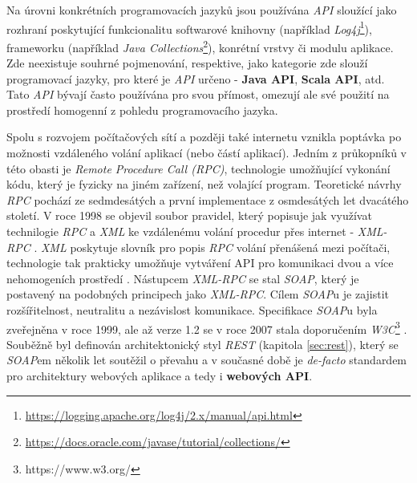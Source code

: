 Na úrovni konkrétních programovacích jazyků jsou používána \textit{API} sloužící jako rozhraní poskytující funkcionalitu softwarové knihovny (například \textit{Log4j}\footnote{\url{https://logging.apache.org/log4j/2.x/manual/api.html}}), frameworku (například \textit{Java Collections}\footnote{\url{https://docs.oracle.com/javase/tutorial/collections/}}), konrétní vrstvy či modulu aplikace. Zde neexistuje souhrné pojmenování, respektive, jako kategorie zde slouží programovací jazyky, pro které je \textit{API} určeno - \textbf{Java API}, \textbf{Scala API}, atd. Tato \textit{API} bývají často používána pro svou přímost, omezují ale své použití na prostředí homogenní z pohledu programovacího jazyka.

Spolu s rozvojem počítačových sítí a později také internetu vznikla poptávka po možnosti vzdáleného volání aplikací (nebo částí aplikací). Jedním z průkopníků v této obasti je \textit{Remote Procedure Call (RPC)}, technologie umožňující vykonání kódu, který je fyzicky na jiném zařízení, než volající program. Teoretické návrhy \textit{RPC} pochází ze sedmdesátých a první implementace z osmdesátých let dvacátého století. V roce 1998 se objevil soubor pravidel, který popisuje jak využívat technilogie \textit{RPC} a \textit{XML} ke vzdálenému volání procedur přes internet - \textit{XML-RPC} \cite{Winner99}. \textit{XML} poskytuje slovník pro popis \textit{RPC} volání přenášená mezi počítači, technologie tak prakticky umožňuje vytváření API pro komunikaci dvou a více nehomogeních prostředí \cite{Laurent01}. Nástupcem \textit{XML-RPC} se stal \textit{SOAP}, který je postavený na podobných principech jako \textit{XML-RPC}. Cílem \textit{SOAP}u je zajistit rozšířitelnost, neutralitu a nezávislost komunikace. Specifikace \textit{SOAP}u byla zveřejněna v roce 1999, ale
až verze 1.2 se v roce 2007 stala doporučením \textit{W3C}\footnote{https://www.w3.org/} \cite{W3C07}. Souběžně byl definován architektonický styl \textit{REST} (kapitola \ref{sec:rest}), který se \textit{SOAP}em několik let soutěžil o převahu a v současné době je \textit{de-facto} standardem pro architektury webových aplikace a tedy i \textbf{webových API}.

